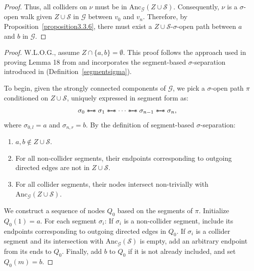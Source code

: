 \documentclass[accepted]{uai2025} %
\newcommand{\anc}{\text{Anc}}
\newcommand{\sus}{\mathrel{{\ast\mkern-11mu\relbar\mkern-9mu\relbar\mkern-11mu\ast}}}
\begin{document}
\begin{proof}
Thus, all colliders on $\nu$ must be in $\anc_\mathcal{G}(Z \cup \mathcal{S})$. Consequently, $\nu$ is a $\sigma$-open walk given $Z \cup \mathcal{S}$ in $\mathcal{G}$ between $v_0$ and $v_n$. Therefore, by Proposition~\ref{proposition3.3.6}, there must exist a $Z \cup \mathcal{S}$-$\sigma$-open path between $a$ and $b$ in $\mathcal{G}$.
\end{proof}



\lemmaeighteen*
\begin{proof}
W.L.O.G., assume $Z\cap\{a,b\}=\emptyset$. This proof follows the approach used in proving Lemma 18 from \citep{spirtes1996polynomial} and incorporates the segment-based $\sigma$-separation introduced in \citep{forre2017markov} (Definition~\ref{segmentsigma}).

To begin, given the strongly connected components of $\mathcal{G}$, we pick a $\sigma$-open path $\pi$ conditioned on $Z \cup \mathcal{S}$, uniquely expressed in segment form as:
\[
\sigma_0 \sus \sigma_1 \sus \cdots \sus \sigma_{n-1} \sus \sigma_n,
\]
where $\sigma_{0,l} = a$ and $\sigma_{n,r} = b$. By the definition of segment-based $\sigma$-separation:
\begin{enumerate}
    \item $a, b \notin Z \cup \mathcal{S}$.
    \item For all non-collider segments, their endpoints corresponding to outgoing directed edges are not in $Z \cup \mathcal{S}$.
    \item For all collider segments, their nodes intersect non-trivially with $\anc_\mathcal{G}(Z \cup \mathcal{S})$.
\end{enumerate}

We construct a sequence of nodes $Q_0$ based on the segments of $\pi$. Initialize $Q_0(1) = a$. For each segment $\sigma_i$: If $\sigma_i$ is a non-collider segment, include its endpoints corresponding to outgoing directed edges in $Q_0$. If $\sigma_i$ is a collider segment and its intersection with $\anc_\mathcal{G}(\mathcal{S})$ is empty, add an arbitrary endpoint from its ends to $Q_0$. Finally, add \( b \) to \( Q_0 \) if it is not already included, and set \( Q_0(m) = b \).


\end{proof}
\end{document}

